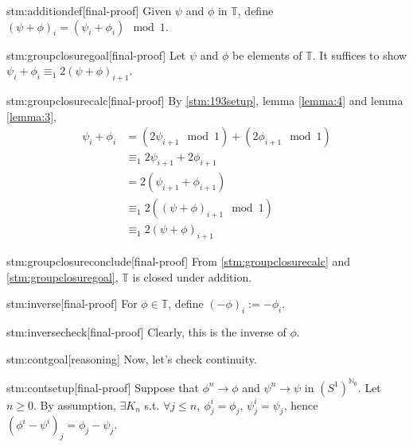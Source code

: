 \begin{stm}{stm:additiondef}[final-proof]
Given $\psi$ and $\phi$ in $\mathbb{T}$, define $(\psi + \phi)_i = (\psi_i + \phi_i) \mod 1$.
\end{stm}

\begin{stm}{stm:groupclosuregoal}[final-proof]
Let $\psi$ and $\phi$ be elements of $\mathbb{T}$. It suffices to show $\psi_i + \phi_i \equiv_1 2(\psi + \phi)_{i+1}$.
\end{stm}

\begin{stm}{stm:groupclosurecalc}[final-proof]
By \ref{stm:193setup}, lemma \ref{lemma:4} and lemma \ref{lemma:3},
\begin{align*}
\psi_i + \phi_i &= (2\psi_{i+1} \mod 1) + (2\phi_{i+1} \mod 1) \\
&\equiv_1 2\psi_{i+1} + 2\phi_{i+1} \\
&= 2(\psi_{i+1} + \phi_{i+1}) \\
&\equiv_1 2((\psi + \phi)_{i+1} \mod 1) \\
&\equiv_1 2(\psi + \phi)_{i+1}
\end{align*}
\end{stm}

\begin{stm}{stm:groupclosureconclude}[final-proof]
From \ref{stm:groupclosurecalc} and \ref{stm:groupclosuregoal}, $\mathbb{T}$ is closed under addition.
\end{stm}

\begin{stm}{stm:inverse}[final-proof]
For $\phi \in \mathbb{T}$, define $(-\phi)_i := -\phi_i$.
\end{stm}

\begin{stm}{stm:inversecheck}[final-proof]
Clearly, this is the inverse of $\phi$.
\end{stm}

\begin{stm}{stm:contgoal}[reasoning]
Now, let's check continuity.
\end{stm}

\begin{stm}{stm:contsetup}[final-proof]
Suppose that $\phi^n \to \phi$ and $\psi^n \to \psi$ in $(S^1)^{\mathbb{N}_0}$. Let $n \ge 0$. By assumption, $\exists K_n$ s.t. $\forall j \le n, \ \phi_j^i = \phi_j$, $\psi_j^i = \psi_j$, hence $(\phi^i - \psi^i)_j = \phi_j - \psi_j$.
\end{stm}


